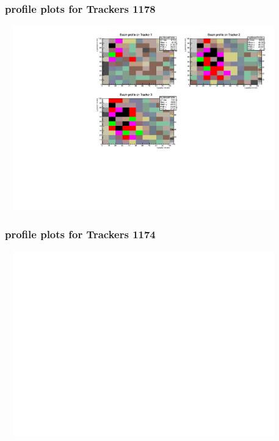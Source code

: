 \documentclass[slidestop,compress,mathserif]{beamer}
\begin{document}
\begin{frame}\frametitle{profile plots for Trackers 1178}
	 \includegraphics[width=12cm,height=8cm]{profile_plots_for_Trackers_1178.pdf}
\end{frame}
\begin{frame}\frametitle{profile plots for Trackers 1174}
	 \includegraphics[width=12cm,height=8cm]{profile_plots_for_Trackers_1174.pdf}
\end{frame}
\end{document}
